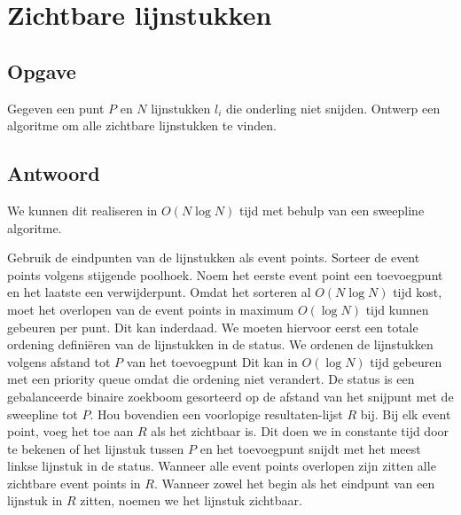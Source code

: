\documentclass[examenvragen.tex]{subfiles}
\begin{document}
\section{Zichtbare lijnstukken}
\subsection{Opgave}
Gegeven een punt $P$ en $N$ lijnstukken $l_i$ die onderling niet snijden. Ontwerp een algoritme om alle zichtbare lijnstukken te vinden.

\subsection{Antwoord}
We kunnen dit realiseren in $O(N\log N)$ tijd met behulp van een sweepline algoritme.

Gebruik de eindpunten van de lijnstukken als event points.
Sorteer de event points volgens stijgende poolhoek.
Noem het eerste event point een toevoegpunt en het laatste een verwijderpunt.
Omdat het sorteren al $O(N\log N)$ tijd kost, moet het overlopen van de event points in maximum $O(\log N)$ tijd kunnen gebeuren per punt.
Dit kan inderdaad. We moeten hiervoor eerst een totale ordening defini\"eren van de lijnstukken in de status. We ordenen de lijnstukken volgens afstand tot $P$ van het toevoegpunt
Dit kan in $O(\log N)$ tijd gebeuren met een priority queue omdat die ordening niet verandert.
De status is een gebalanceerde binaire zoekboom gesorteerd op de afstand van het snijpunt met de sweepline tot $P$.
Hou bovendien een voorlopige resultaten-lijst $R$ bij.
Bij elk event point, voeg het toe aan $R$ als het zichtbaar is.
Dit doen we in constante tijd door te bekenen of het lijnstuk tussen $P$ en het toevoegpunt snijdt met het meest linkse lijnstuk in de status. 
Wanneer alle event points overlopen zijn zitten alle zichtbare event points in $R$. Wanneer zowel het begin als het eindpunt van een lijnstuk in $R$ zitten, noemen we het lijnstuk zichtbaar. 
\end{document}
